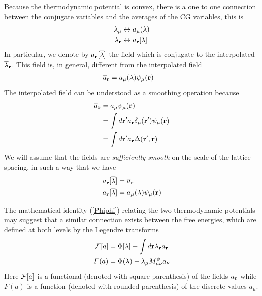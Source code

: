 \documentclass[b5paper,openright,11pt]{book}
\begin{document}
\begin{appendices}
Because the thermodynamic potential is convex, there is a one to one connection between
the conjugate variables and the averages of the CG variables, this is
\begin{align}
  \lambda_\mu &\leftrightarrow a_\mu(\lambda)
\nonumber\\
  \lambda_{\bf r} &\leftrightarrow a_{\bf r}[\lambda]
\end{align}
In particular, we denote by $a_{\bf r}[\overline{\lambda}]  $ the field which is
conjugate to the interpolated $\overline{\lambda}_{\bf r}$.
This field is, in general, different from the interpolated field
\begin{align}
  \overline{a}_{\bf r}&=a_\mu(\lambda)\psi_\mu({\bf r})
\end{align}
The interpolated field can be understood as a smoothing operation because
\begin{align}
  \overline{a}_{\bf r}&=a_\mu\psi_\mu({\bf r})
\nonumber\\
&=\int d{\bf r}'a_{\bf r}\delta_\mu({\bf r}')\psi_\mu({\bf r})
\nonumber\\
&=\int d{\bf r}'a_{\bf r}\Delta({\bf r}',{\bf r})
\end{align}
 We will assume that the fields are \textit{sufficiently smooth}
on the scale of the lattice spacing, in such a way that we have
\begin{align}
  a_{\bf r}[\overline{\lambda}] &=  \overline{a}_{\bf r}
\nonumber\\
  a_{\bf r}[\overline{\lambda}] &= a_\mu(\lambda)\psi_\mu({\bf r})
\label{smooth}
\end{align}


The   mathematical   identity    (\ref{Phiphi})   relating   the   two
thermodynamic potentials may suggest  that a similar connection exists
between the  free energies, which  are defined  at both levels  by the
Legendre transforms
\begin{align}
  {\cal F}[a]&=\Phi[\lambda]-\int d{\bf r}\lambda_{\bf r}a_{\bf r}
\nonumber\\
F(a)&=\Phi(\lambda)- \lambda_\mu M^\psi_{\mu\nu}a_\nu
\label{FF0}
\end{align}
Here ${\cal F}[a]$  is a functional (denoted  with square parenthesis)
of the  fields $a_{\bf r}$  while $F(a)$  is a function  (denoted with
rounded parenthesis)  of the discrete values  $a_\mu$. 


\end{appendices}
\end{document}
